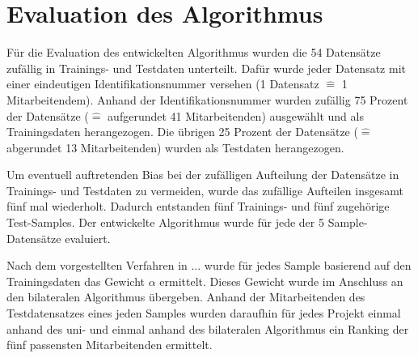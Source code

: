 

\section{Evaluation des Algorithmus}
Für die Evaluation des entwickelten Algorithmus wurden die 54 Datensätze zufällig in Trainings- und Testdaten unterteilt.
Dafür wurde jeder Datensatz mit einer eindeutigen Identifikationsnummer versehen (1 Datensatz $\hat{=}$ 1 Mitarbeitendem).
Anhand der Identifikationsnummer wurden zufällig 75 Prozent der Datensätze ($\hat{=}$ aufgerundet 41 Mitarbeitenden) ausgewählt und als Trainingsdaten herangezogen.
Die übrigen 25 Prozent der Datensätze ($\hat{=}$ abgerundet 13 Mitarbeitenden) wurden als Testdaten herangezogen.

Um eventuell auftretenden Bias bei der zufälligen Aufteilung der Datensätze in Trainings- und Testdaten zu vermeiden, wurde das zufällige Aufteilen insgesamt fünf mal wiederholt.
Dadurch entstanden fünf Trainings- und fünf zugehörige Test-Samples.
Der entwickelte Algorithmus wurde für jede der 5 Sample-Datensätze evaluiert.

Nach dem vorgestellten Verfahren in ... wurde für jedes Sample basierend auf den Trainingsdaten das Gewicht $\alpha$ ermittelt.
Dieses Gewicht wurde im Anschluss an den bilateralen Algorithmus übergeben.
Anhand der Mitarbeitenden des Testdatensatzes eines jeden Samples wurden daraufhin für jedes Projekt einmal anhand des uni- und einmal anhand des bilateralen Algorithmus ein Ranking der fünf passensten Mitarbeitenden ermittelt.

